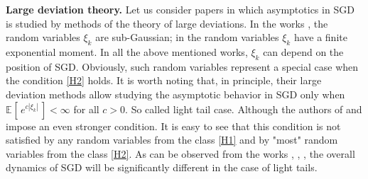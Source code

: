 \documentclass{article}
\theoremstyle{plain}
\theoremstyle{definition}
\theoremstyle{remark}
\newcommand{\e}[2][]{{\mathbb{E}_{#1}\left[ \, #2 \,\right] }} %
\begin{document}
\textbf{Large deviation theory.}
Let us consider papers in which asymptotics in SGD is studied by methods of the theory of large deviations. In the works \citet{Azizian2024LDP}, \citet{Bajovic2023LDP}   the random variables \(\xi_k\) are sub-Gaussian; in \citet{Hult2025LDP}
the random variables $\xi_k$  have a finite exponential moment.  In all the above mentioned  works, $\xi_k$ can depend  on the position of SGD.
Obviously, such random variables represent a special case when the condition \ref{H2} holds.   
It is worth noting that, in principle, their large deviation methods allow studying the asymptotic behavior in SGD only when 
\(
\e{e^{c|\xi_k|}} < \infty
\)
for all \(c > 0\).  So called light tail case. Although the authors of \citet{Azizian2024LDP} and \citet{Bajovic2023LDP}  impose an even stronger condition.  
It is easy to see that this condition is not satisfied by any random variables from the class \ref{H1} and by "most" random variables from the class \ref{H2}.  
As can be observed from the works \citet{wang2021eliminating}, \citet{imkeller2008metastable}, \citet{simsekli2019tail, csimcsekli2019heavy}, the overall dynamics of SGD will be significantly different in the case of light tails. 

\end{document}
